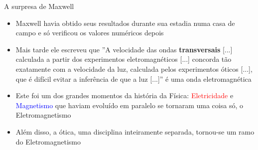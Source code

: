 \begin{frame}{A surpresa de Maxwell}
    \begin{itemize} 
        \item Maxwell havia obtido
            seus resultados durante sua estadia numa casa de campo e só verificou os
            valores numéricos depois

        \item Mais tarde ele escreveu que ''A velocidade das ondas
            \textbf{transversais} [...] calculada a partir dos experimentos
            eletromagnéticos [...] concorda tão exatamente com a velocidade da luz,
            calculada pelos experimentos óticos [...], que é difícil evitar a
            inferência de que a luz [...]''  é uma onda eletromagnética 

        \item Este foi um dos grandes momentos da história da Física:
            \textcolor{red}{Eletricidade} e \textcolor{blue}{Magnetismo} que haviam
            evoluído em paralelo se tornaram uma  coisa só, o
            \textcolor{green!50!black}{Eletromagnetismo} 

        \item Além disso, a ótica, uma disciplina inteiramente separada,
            tornou-se um ramo do Eletromagnetismo
    \end{itemize} 
\end{frame}
